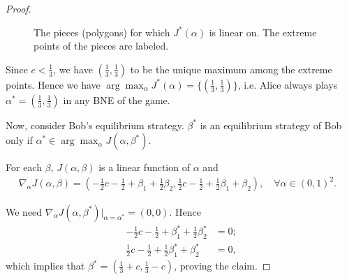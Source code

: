 \documentclass[pdflatex,sn-basic]{sn-jnl}
\theoremstyle{thmstyleone}%
\theoremstyle{thmstyletwo}%
\theoremstyle{thmstylethree}%
\begin{document}
\begin{appendices}
\begin{proof}
\begin{figure}[!ht]
		\caption{The pieces (polygons) for which $J^*(\alpha)$ is linear on. The extreme points of the pieces are labeled.} \label{fig: extremepoints}
	\end{figure}
	
	Since $c < \frac{1}{3}$, we have $(\frac{1}{3}, \frac{1}{3})$ to be the unique maximum among the extreme points. Hence we have $\arg\max_{\alpha} J^*(\alpha) = \{(\frac{1}{3}, \frac{1}{3}) \}$, i.e. Alice always plays $\alpha^*=(\frac{1}{3}, \frac{1}{3})$ in any BNE of the game.
	
	Now, consider Bob's equilibrium strategy. $\beta^*$ is an equilibrium strategy of Bob only if $\alpha^* \in \arg\max_{\alpha} J(\alpha, \beta^*)$.
	
	For each $\beta$, $J(\alpha, \beta)$ is a linear function of $\alpha$ and
	\begin{align*}
		\nabla_{\alpha} J(\alpha, \beta) = \left(-\frac{1}{2}c - \frac{1}{2} + \beta_1 + \frac{1}{2}\beta_2, \frac{1}{2}c - \frac{1}{2} + \frac{1}{2}\beta_1 + \beta_2 \right),\quad \forall \alpha\in (0, 1)^2.&
	\end{align*}
	
	We need $\nabla_{\alpha} J(\alpha, \beta^*)\Big|_{\alpha=\alpha^*} = (0, 0)$. Hence
	\begin{align*}
		-\frac{1}{2}c - \frac{1}{2} + \beta_1^* + \frac{1}{2}\beta_2^* &= 0;\\
		\frac{1}{2}c - \frac{1}{2} + \frac{1}{2}\beta_1^* + \beta_2^* &= 0,
	\end{align*}
	which implies that $\beta^*=(\frac{1}{3}+c, \frac{1}{3}-c)$, proving the claim.
\end{proof}

\end{appendices}

%
%
 
\end{document}
